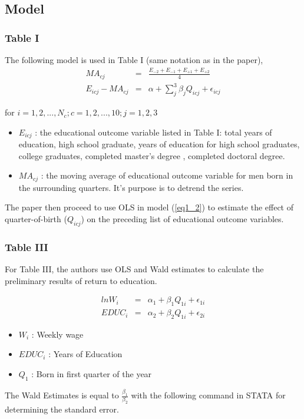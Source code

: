 \documentclass{article}
\begin{document}
\subsection{Model}
\subsubsection{Table I}
The following model is used in Table I (same notation as in the paper),
\begin{eqnarray}
 \label{eq1_1}
  MA_{cj} &=& \frac{E_{-2}+E_{-1}+E_{+1}+E_{+2}}{4}\\
  \label{eq1_2}
  E_{icj} - MA_{cj} &=&  \alpha +  \displaystyle\sum_{j}^3 \beta_j Q_{icj} + \epsilon_{icj}
\end{eqnarray}

for $i = 1, 2,..., N_c; c = 1, 2, ..., 10; j = 1, 2, 3 $ 
\begin{itemize}
\item $E_{icj}$ : the educational outcome variable listed in Table I: total years of education, high school graduate, years of education for high school graduates, college graduates, completed master's degree
, completed doctoral degree.

\item  $MA_{cj}$ : the moving average of educational outcome variable for men born in the surrounding quarters. It's purpose is to detrend the series.
\end{itemize}

The paper then proceed to use OLS in model (\ref{eq1_2}) to estimate the effect of quarter-of-birth ($Q_{icj}$) on the preceding list of educational outcome variables.

\subsubsection{Table III}
For Table III, the authors use OLS and Wald estimates to calculate the preliminary results of return to education.

\begin{eqnarray}
 \label{eq3_1}
  ln W_i  &=&  \alpha_1 + \beta_1 Q_{1i} +\epsilon_{1i}\\
  \label{eq3_2}
  EDUC_i &=&  \alpha_2 + \beta_2 Q_{1i} +\epsilon_{2i}
\end{eqnarray}

\begin{itemize}
\item $W_i$ : Weekly wage
\item $EDUC_i$ : Years of Education
\item $Q_1$ : Born in first quarter of the year
\end{itemize}
The Wald Estimates is equal to $\frac{\beta_1}{\beta_2}$ with the following command in STATA for determining the standard error.
\end{document}
